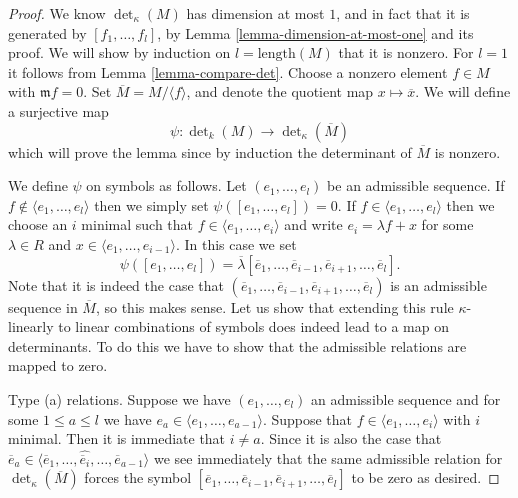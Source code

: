 \begin{proof}
We know $\det_\kappa(M)$ has dimension at most $1$, and in fact that it
is generated by $[f_1, \ldots, f_l]$, by
Lemma \ref{lemma-dimension-at-most-one} and its proof.
We will show by induction on $l = \text{length}(M)$
that it is nonzero. For $l = 1$ it follows from Lemma \ref{lemma-compare-det}.
Choose a nonzero element $f \in M$
with $\mathfrak m f = 0$. Set $\overline{M} = M /\langle f \rangle$,
and denote the quotient map $x \mapsto \overline{x}$.
We will define a surjective map
$$
\psi : \det\nolimits_k(M) \to \det\nolimits_\kappa(\overline{M})
$$
which will prove the lemma since by induction the determinant of
$\overline{M}$ is nonzero.

\medskip\noindent
We define $\psi$ on symbols as follows.
Let $(e_1, \ldots, e_l)$ be an admissible sequence.
If $f \not \in \langle e_1, \ldots, e_l \rangle$ then
we simply set $\psi([e_1, \ldots, e_l]) = 0$.
If $f \in \langle e_1, \ldots, e_l \rangle$ then we choose
an $i$ minimal such that $f \in \langle e_1, \ldots, e_i \rangle$
and write $e_i = \lambda f + x$ for some $\lambda \in R$
and $x \in \langle e_1, \ldots, e_{i - 1} \rangle$.
In this case we set
$$
\psi([e_1, \ldots, e_l]) =
\overline{\lambda}[\overline{e}_1, \ldots,
\overline{e}_{i - 1},
\overline{e}_{i + 1}, \ldots, \overline{e}_l].
$$
Note that it is indeed the case that
$(\overline{e}_1, \ldots,
\overline{e}_{i - 1},
\overline{e}_{i + 1}, \ldots, \overline{e}_l)$
is an admissible sequence in $\overline{M}$, so this makes sense.
Let us show that extending this rule $\kappa$-linearly to
linear combinations of symbols does indeed lead to a map on
determinants. To do this we have to show that the admissible
relations are mapped to zero.

\medskip\noindent
Type (a) relations. Suppose we have $(e_1, \ldots, e_l)$ an
admissible sequence and for some $1 \leq a \leq l$ we have
$e_a \in \langle e_1, \ldots, e_{a - 1}\rangle$.
Suppose that $f \in \langle e_1, \ldots, e_i\rangle$ with $i$ minimal.
Then it is immediate that $i \not = a$. Since it is also
the case that
$\overline{e}_a \in
\langle \overline{e}_1, \ldots, \hat{\overline{e}_i}, \ldots,
\overline{e}_{a - 1}\rangle$ we see immediately that the same
admissible relation for $\det_\kappa(\overline{M})$ forces
the symbol $[\overline{e}_1, \ldots,
\overline{e}_{i - 1},
\overline{e}_{i + 1}, \ldots, \overline{e}_l]$
to be zero as desired.


\end{proof}
